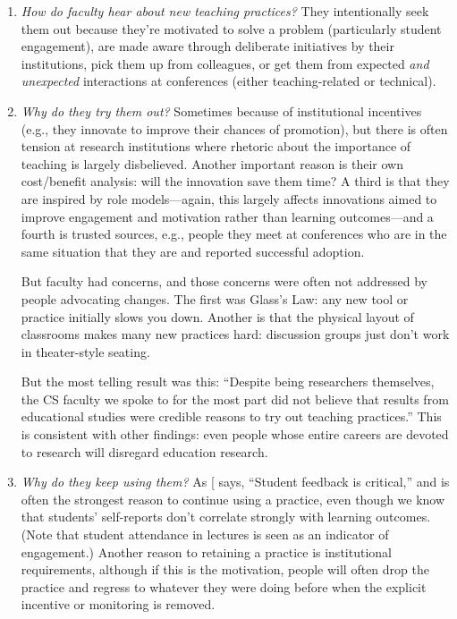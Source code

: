 \begin{enumerate}
\item
  \emph{How do faculty hear about new teaching practices?} They
  intentionally seek them out because they're motivated to solve a
  problem (particularly student engagement), are made aware through
  deliberate initiatives by their institutions, pick them up from
  colleagues, or get them from expected \emph{and unexpected} interactions
  at conferences (either teaching-related or technical).
\item
  \emph{Why do they try them out?} Sometimes because of institutional
  incentives (e.g., they innovate to improve their chances of
  promotion), but there is often tension at research institutions
  where rhetoric about the importance of teaching is largely
  disbelieved. Another important reason is their own cost/benefit
  analysis: will the innovation save them time? A third is that they
  are inspired by role models---again, this largely affects innovations
  aimed to improve engagement and motivation rather than learning
  outcomes---and a fourth is trusted sources, e.g., people they meet at
  conferences who are in the same situation that they are and reported
  successful adoption.

  But faculty had concerns, and those concerns were often not
  addressed by people advocating changes. The first was Glass's Law:
  any new tool or practice initially slows you down. Another is that
  the physical layout of classrooms makes many new practices hard:
  discussion groups just don't work in theater-style seating.

  But the most telling result was this: ``Despite being researchers
  themselves, the CS faculty we spoke to for the most part did not
  believe that results from educational studies were credible reasons
  to try out teaching practices.'' This is consistent with other
  findings: even people whose entire careers are devoted to research
  will disregard education research.
\item
  \emph{Why do they keep using them?} As {[}\protect[\hyperlink{b:Bark2015}{Bark2015}]{]} says, ``Student
  feedback is critical,'' and is often the strongest reason to continue
  using a practice, even though we know that students' self-reports
  don't correlate strongly with learning outcomes. (Note that student
  attendance in lectures is seen as an indicator of engagement.)
  Another reason to retaining a practice is institutional
  requirements, although if this is the motivation, people will often
  drop the practice and regress to whatever they were doing before
  when the explicit incentive or monitoring is removed.
\end{enumerate}

